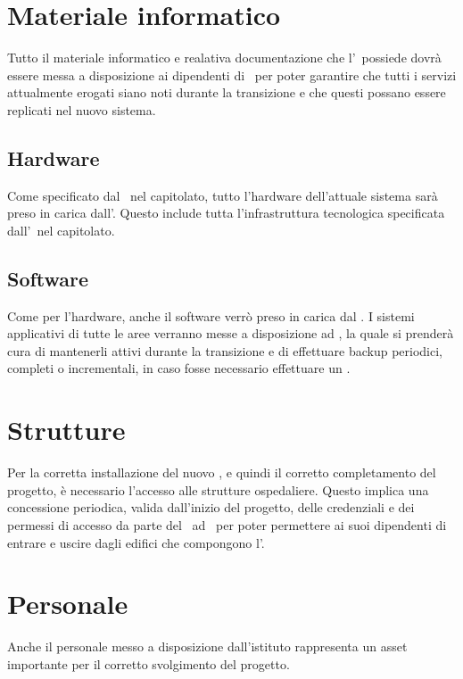 \section{Materiale informatico}

	Tutto il materiale informatico e realativa documentazione che l'\istituto~possiede dovrà essere messa a disposizione ai dipendenti di \azienda~per poter garantire che tutti i servizi attualmente erogati siano noti durante la transizione e che questi possano essere replicati nel nuovo sistema.

	\subsection{Hardware}
		
		Come specificato dal \proponente~nel capitolato, tutto l'hardware dell'attuale sistema sarà preso in carica dall'\offerente.
		Questo include tutta l'infrastruttura tecnologica specificata dall'\istituto~nel capitolato.
		
	\subsection{Software}
	
		Come per l'hardware, anche il software verrò preso in carica dal \offerente.
		I sistemi applicativi di tutte le aree verranno messe a disposizione ad \azienda, la quale si prenderà cura di mantenerli attivi durante la transizione e di effettuare backup periodici, completi o incrementali, in caso fosse necessario effettuare un \rollback.
	
\section{Strutture}

	Per la corretta installazione del nuovo \helpdesk, e quindi il corretto completamento del progetto, è necessario l'accesso alle strutture ospedaliere.
	Questo implica una concessione periodica, valida dall'inizio del progetto, delle credenziali e dei permessi di accesso da parte del \proponente~ad \azienda~per poter permettere ai suoi dipendenti di entrare e uscire dagli edifici che compongono l'\istituto.

\section{Personale}

	Anche il personale messo a disposizione dall'istituto rappresenta un asset importante per il corretto svolgimento del progetto.
	
